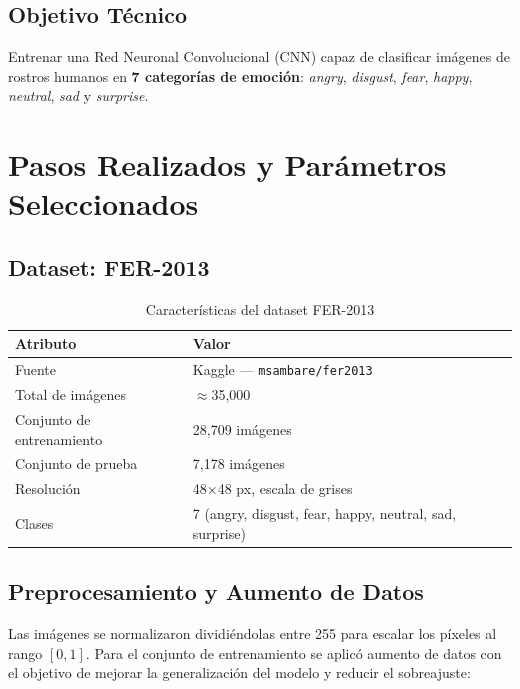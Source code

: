 \documentclass[12pt, a4paper]{article}
\begin{document}
\subsection{Objetivo Técnico}

Entrenar una Red Neuronal Convolucional (CNN) capaz de clasificar imágenes de rostros humanos
en \textbf{7 categorías de emoción}: \textit{angry}, \textit{disgust}, \textit{fear},
\textit{happy}, \textit{neutral}, \textit{sad} y \textit{surprise}.

\section{Pasos Realizados y Parámetros Seleccionados}

\subsection{Dataset: FER-2013}

\begin{table}[H]
  \centering
  \caption{Características del dataset FER-2013}
  \begin{tabular}{ll}
    \toprule
    \textbf{Atributo} & \textbf{Valor} \\
    \midrule
    Fuente            & Kaggle — \texttt{msambare/fer2013} \\
    Total de imágenes & $\approx$35,000 \\
    Conjunto de entrenamiento & 28,709 imágenes \\
    Conjunto de prueba        & 7,178 imágenes \\
    Resolución        & 48×48 px, escala de grises \\
    Clases            & 7 (angry, disgust, fear, happy, neutral, sad, surprise) \\
    \bottomrule
  \end{tabular}
\end{table}

\subsection{Preprocesamiento y Aumento de Datos}

Las imágenes se normalizaron dividiéndolas entre 255 para escalar los píxeles al rango $[0,1]$.
Para el conjunto de entrenamiento se aplicó aumento de datos con el objetivo de mejorar la
generalización del modelo y reducir el sobreajuste:
\end{document}
